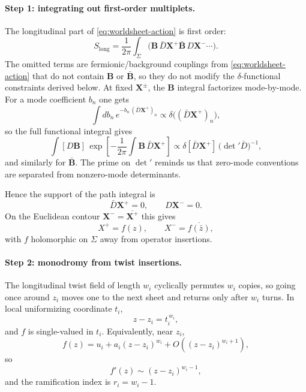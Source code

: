 \documentclass[11pt]{article}
\begin{document}
\paragraph{Step 1: integrating out first-order multiplets.}
The longitudinal part of \eqref{eq:worldsheet-action} is first order:
\begin{equation}
S_{\mathrm{long}}
=
\frac{1}{2\pi}\int_\Sigma
\Big(
\mathbf B\,\bar D\mathbf X^+
\bar{\mathbf B}\,D\mathbf X^-
\cdots
\Big).
\end{equation}
The omitted terms are fermionic/background couplings from \eqref{eq:worldsheet-action} that do not contain $\mathbf B$ or $\bar{\mathbf B}$, so they do not modify the $\delta$-functional constraints derived below.
At fixed $\mathbf X^\pm$, the $\mathbf B$ integral factorizes mode-by-mode. For a mode coefficient $b_n$ one gets
\begin{equation}
\int db_n\,e^{-b_n\,(\bar D\mathbf X^+)_n}
\propto
\delta\!\big((\bar D\mathbf X^+)_n\big),
\end{equation}
so the full functional integral gives
\begin{equation}\label{eq:delta-functional}
\int [D\mathbf B]\,
\exp\!\left[
-\frac{1}{2\pi}\int \mathbf B\,\bar D\mathbf X^+
\right]
\propto
\delta[\bar D\mathbf X^+]\,
\big(\det{}'\bar D\big)^{-1},
\end{equation}
and similarly for $\bar{\mathbf B}$. The prime on $\det{}'$ reminds us that zero-mode conventions are separated from nonzero-mode determinants.

Hence the support of the path integral is
\begin{equation}\label{eq:chiral-constraints}
\bar D\mathbf X^+=0,\qquad D\mathbf X^-=0.
\end{equation}
On the Euclidean contour $\mathbf X^-=\overline{\mathbf X^+}$ this gives
\begin{equation}
X^+=f(z),\qquad X^-=\overline{f(\bar z)},
\end{equation}
with $f$ holomorphic on $\Sigma$ away from operator insertions.

\paragraph{Step 2: monodromy from twist insertions.}
The longitudinal twist field of length $w_i$ cyclically permutes $w_i$ copies, so going once around $z_i$ moves one to the next sheet and returns only after $w_i$ turns. In local uniformizing coordinate $t_i$,
\begin{equation}
z-z_i=t_i^{\,w_i},
\end{equation}
and $f$ is single-valued in $t_i$. Equivalently, near $z_i$,
\begin{equation}\label{eq:branch-local}
f(z)=u_i+a_i(z-z_i)^{w_i}+O((z-z_i)^{w_i+1}),
\end{equation}
so
\begin{equation}
f'(z)\sim (z-z_i)^{w_i-1},
\end{equation}
and the ramification index is $r_i=w_i-1$.
\end{document}
